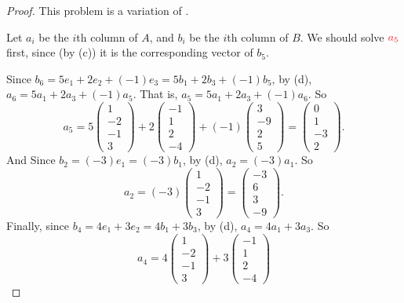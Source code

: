 \begin{proof}
This problem is a variation of .

Let \(a_i\) be the \(i\)th column of \(A\), and \(b_i\) be the \(i\)th column of \(B\).
We should solve \(\RED{a_5}\) first, since (by (c)) it is the corresponding \LID{} vector of \(b_5\).

Since \(b_6 = 5 e_1 + 2 e_2 + (-1) e_3 = 5 b_1 + 2 b_3 + (-1) b_5\), by (d), \(a_6 = 5 a_1 + 2 a_3 + (-1) a_5\).
That is, \(a_5 = 5 a_1 + 2 a_3 + (-1) a_6\).
So
\[
    a_5 = 5 \begin{pmatrix} 1 \\ -2 \\ -1 \\ 3 \end{pmatrix}
        + 2 \begin{pmatrix} -1 \\ 1 \\ 2 \\ -4 \end{pmatrix}
        + (-1) \begin{pmatrix} 3 \\ -9 \\ 2 \\ 5 \end{pmatrix}
        = \begin{pmatrix} 0 \\ 1 \\ -3 \\ 2 \end{pmatrix}.
\]
And Since \(b_2 = (-3) e_1 = (-3) b_1\), by (d), \(a_2 = (-3) a_1\).
So
\[
    a_2 = (-3) \begin{pmatrix} 1 \\ -2 \\ -1 \\ 3 \end{pmatrix}
        = \begin{pmatrix} -3 \\ 6 \\ 3 \\ -9 \end{pmatrix}.
\]
Finally, since \(b_4 = 4 e_1 + 3 e_2 = 4 b_1 + 3 b_3\), by (d), \(a_4 = 4 a_1 + 3 a_3\).
So
\[
    a_4 = 4 \begin{pmatrix} 1 \\ -2 \\ -1 \\ 3 \end{pmatrix}
        + 3 \begin{pmatrix} -1 \\ 1 \\ 2 \\ -4 \end{pmatrix}
\]
\end{proof}
